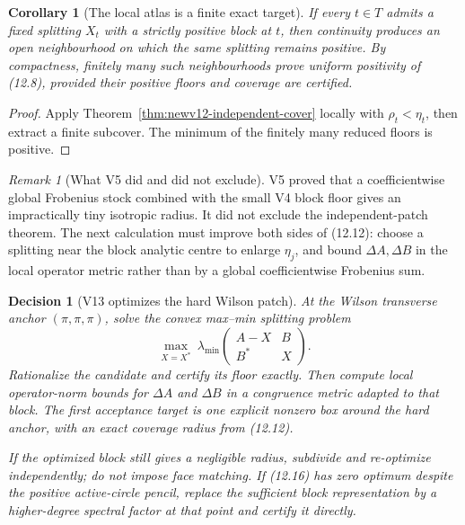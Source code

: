 \documentclass[11pt,oneside]{article}
\newtheorem{corollary}[theorem]{Corollary}
\newtheorem{decision}[theorem]{Decision}
\theoremstyle{definition}
\theoremstyle{remark}
\newtheorem{remark}[theorem]{Remark}
\begin{document}
\begin{corollary}[The local atlas is a finite exact target]
\label{cor:newv12-finite-atlas}
If every \(t\in T\) admits a fixed splitting \(X_t\) with a strictly
positive block at \(t\), then continuity produces an open
neighbourhood on which the same splitting remains positive.  By
compactness, finitely many such neighbourhoods prove uniform
positivity of (12.8), provided their positive floors and coverage are
certified.
\end{corollary}

\begin{proof}
Apply Theorem~\ref{thm:newv12-independent-cover} locally with
\(\rho_t<\eta_t\), then extract a finite subcover.  The minimum of the
finitely many reduced floors is positive.
\end{proof}

\begin{remark}[What V5 did and did not exclude]
\label{rem:newv12-v5}
V5 proved that a coefficientwise global Frobenius stock combined with
the small V4 block floor gives an impractically tiny isotropic radius.
It did not exclude the independent-patch theorem.  The next
calculation must improve both sides of (12.12): choose a splitting
near the block analytic centre to enlarge \(\eta_j\), and bound
\(\Delta A,\Delta B\) in the local operator metric rather than by a
global coefficientwise Frobenius sum.
\end{remark}

\begin{decision}[V13 optimizes the hard Wilson patch]
\label{dec:newv12-next}
At the Wilson transverse anchor \((\pi,\pi,\pi)\), solve the convex
max--min splitting problem
\[
 \max_{X=X^*}\ 
 \lambda_{\min}
 \begin{pmatrix}A-X&B\\B^*&X\end{pmatrix}.                \tag{12.16}
\]
Rationalize the candidate and certify its floor exactly.  Then
compute local operator-norm bounds for \(\Delta A\) and \(\Delta B\)
in a congruence metric adapted to that block.  The first acceptance
target is one explicit nonzero box around the hard anchor, with an
exact coverage radius from (12.12).

If the optimized block still gives a negligible radius, subdivide and
re-optimize independently; do not impose face matching.  If
(12.16) has zero optimum despite the positive active-circle pencil,
replace the sufficient block representation by a higher-degree
spectral factor at that point and certify it directly.
\end{decision}
\end{document}
